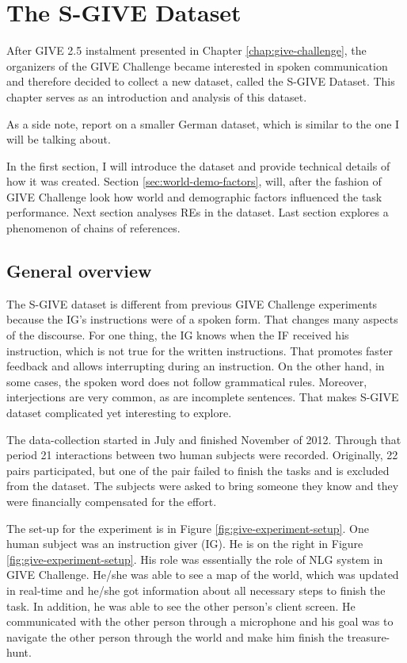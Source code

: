 \chapter{The S-GIVE Dataset}
After GIVE 2.5 instalment presented in Chapter \ref{chap:give-challenge}, the organizers of the GIVE Challenge became interested in spoken communication and therefore decided to collect a new dataset, called the S-GIVE Dataset. This chapter serves as an introduction and analysis of this dataset.

As a side note, \citet{striegnitz2012referring} report on a smaller German dataset, which is similar to the one I will be talking about. 

In the first section, I will introduce the dataset and provide technical details of how it was created. Section \ref{sec:world-demo-factors}, will, after the fashion of GIVE Challenge look how world and demographic factors influenced the task performance. Next section analyses REs in the dataset. Last section explores a phenomenon of chains of references.

\section{General overview}
\label{sec:general-overview}
The S-GIVE dataset is different from previous GIVE Challenge experiments because the IG's instructions were of a spoken form. That changes many aspects of the discourse. For one thing, the IG knows when the IF received his instruction, which is not true for the written instructions. That promotes faster feedback and allows interrupting during an instruction. On the other hand, in some cases, the spoken word does not follow grammatical rules. Moreover, interjections are very common, as are incomplete sentences. That makes S-GIVE dataset complicated yet interesting to explore.

The data-collection started in July and finished November of 2012. Through that period 21 interactions between two human subjects were recorded. Originally, 22 pairs participated, but one of the pair failed to finish the tasks and is excluded from the dataset. The subjects were asked to bring someone they know and they were financially compensated for the effort. 

The set-up for the experiment is in Figure \ref{fig:give-experiment-setup}. One human subject was an instruction giver (IG). He is on the right in Figure \ref{fig:give-experiment-setup}. His role was essentially the role of NLG system in GIVE Challenge. He/she was able to see a map of the world, which was updated in real-time and he/she got information about all necessary steps to finish the task. In addition, he was able to see the other person's client screen. He communicated with the other person through a microphone and his goal was to navigate the other person through the world and make him finish the treasure-hunt.

